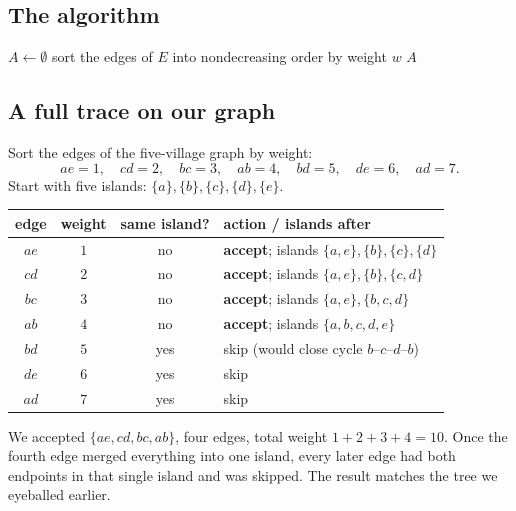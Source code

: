 \subsection{The algorithm}

\begin{algorithm}[H]
\caption{\textsc{MST-Kruskal}$(G, w)$}
$A \gets \emptyset$\;
sort the edges of $E$ into nondecreasing order by weight $w$\;
\Return $A$\;
\end{algorithm}

\subsection{A full trace on our graph}

Sort the edges of the five-village graph by weight:
\[ ae=1,\quad cd=2,\quad bc=3,\quad ab=4,\quad bd=5,\quad de=6,\quad ad=7. \]
Start with five islands: $\{a\},\{b\},\{c\},\{d\},\{e\}$.

\begin{center}
\renewcommand{\arraystretch}{1.25}
\begin{tabular}{c c c l}
\toprule
edge & weight & same island? & action / islands after \\
\midrule
$ae$ & $1$ & no  & \textbf{accept}; islands $\{a,e\},\{b\},\{c\},\{d\}$ \\
$cd$ & $2$ & no  & \textbf{accept}; islands $\{a,e\},\{b\},\{c,d\}$ \\
$bc$ & $3$ & no  & \textbf{accept}; islands $\{a,e\},\{b,c,d\}$ \\
$ab$ & $4$ & no  & \textbf{accept}; islands $\{a,b,c,d,e\}$ \\
$bd$ & $5$ & yes & skip (would close cycle $b$--$c$--$d$--$b$) \\
$de$ & $6$ & yes & skip \\
$ad$ & $7$ & yes & skip \\
\bottomrule
\end{tabular}
\end{center}

We accepted $\{ae, cd, bc, ab\}$, four edges, total weight $1+2+3+4 = 10$. Once
the fourth edge merged everything into one island, every later edge had both
endpoints in that single island and was skipped. The result matches the tree we
eyeballed earlier.

